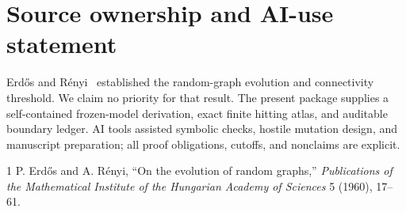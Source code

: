 \documentclass[10pt]{article}
\begin{document}
\section*{Source ownership and AI-use statement}
Erd\H{o}s and R\'enyi~\cite{ER} established the random-graph evolution and
connectivity threshold.  We claim no priority for that result.  The present
package supplies a self-contained frozen-model derivation, exact finite
hitting atlas, and auditable boundary ledger.  AI tools assisted symbolic
checks, hostile mutation design, and manuscript preparation; all proof
obligations, cutoffs, and nonclaims are explicit.

\begin{thebibliography}{1}
 P. Erd\H{o}s and A. R\'enyi, ``On the evolution of random
graphs,'' \emph{Publications of the Mathematical Institute of the Hungarian
Academy of Sciences} 5 (1960), 17--61.
\end{thebibliography}
\end{document}
